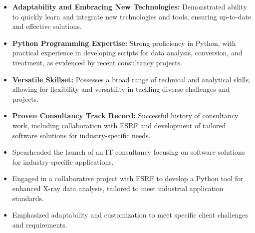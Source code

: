 \documentclass[10pt,a4paper,ragged2e,withhyper]{altacv}
\begin{document}
\begin{paracol}{2}
\begin{itemize}
    \item \textbf{Adaptability and Embracing New Technologies:} Demonstrated ability to quickly learn and integrate new technologies and tools, ensuring up-to-date and effective solutions.
    \item \textbf{Python Programming Expertise:} Strong proficiency in Python, with practical experience in developing scripts for data analysis, conversion, and treatment, as evidenced by recent consultancy projects.
    \item \textbf{Versatile Skillset:} Possesses a broad range of technical and analytical skills, allowing for flexibility and versatility in tackling diverse challenges and projects.
    \item \textbf{Proven Consultancy Track Record:} Successful history of consultancy work, including collaboration with ESRF and development of tailored software solutions for industry-specific needs.
\end{itemize}


    \begin{multicols}{2}
        \begin{itemize}
            \item Spearheaded the launch of an IT consultancy focusing on software solutions for industry-specific applications.
            \item Engaged in a collaborative project with ESRF to develop a Python tool for enhanced X-ray data analysis, tailored to meet industrial application standards.
            \item Emphasized adaptability and customization to meet specific client challenges and requirements.
        \end{itemize}
    \end{multicols}
        
        \divider
        

\end{paracol}
\end{document}
